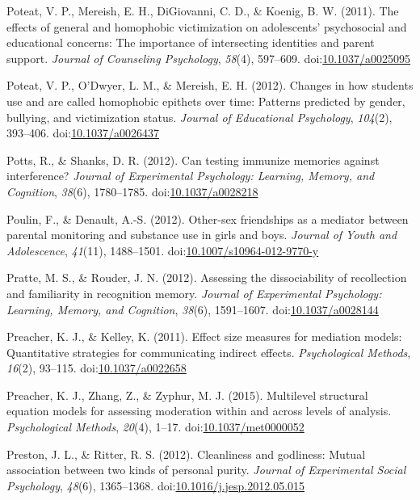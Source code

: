 \documentclass[english,man]{apa6}
\begin{document}
\hypertarget{ref-Poteat2011}{}
Poteat, V. P., Mereish, E. H., DiGiovanni, C. D., \& Koenig, B. W.
(2011). The effects of general and homophobic victimization on
adolescents' psychosocial and educational concerns: The importance of
intersecting identities and parent support. \emph{Journal of Counseling
Psychology}, \emph{58}(4), 597--609.
doi:\href{https://doi.org/10.1037/a0025095}{10.1037/a0025095}

\hypertarget{ref-Poteat2012}{}
Poteat, V. P., O'Dwyer, L. M., \& Mereish, E. H. (2012). Changes in how
students use and are called homophobic epithets over time: Patterns
predicted by gender, bullying, and victimization status. \emph{Journal
of Educational Psychology}, \emph{104}(2), 393--406.
doi:\href{https://doi.org/10.1037/a0026437}{10.1037/a0026437}

\hypertarget{ref-Potts2012}{}
Potts, R., \& Shanks, D. R. (2012). Can testing immunize memories
against interference? \emph{Journal of Experimental Psychology:
Learning, Memory, and Cognition}, \emph{38}(6), 1780--1785.
doi:\href{https://doi.org/10.1037/a0028218}{10.1037/a0028218}

\hypertarget{ref-Poulin2012}{}
Poulin, F., \& Denault, A.-S. (2012). Other-sex friendships as a
mediator between parental monitoring and substance use in girls and
boys. \emph{Journal of Youth and Adolescence}, \emph{41}(11),
1488--1501.
doi:\href{https://doi.org/10.1007/s10964-012-9770-y}{10.1007/s10964-012-9770-y}

\hypertarget{ref-Pratte2012}{}
Pratte, M. S., \& Rouder, J. N. (2012). Assessing the dissociability of
recollection and familiarity in recognition memory. \emph{Journal of
Experimental Psychology: Learning, Memory, and Cognition}, \emph{38}(6),
1591--1607.
doi:\href{https://doi.org/10.1037/a0028144}{10.1037/a0028144}

\hypertarget{ref-Preacher2011}{}
Preacher, K. J., \& Kelley, K. (2011). Effect size measures for
mediation models: Quantitative strategies for communicating indirect
effects. \emph{Psychological Methods}, \emph{16}(2), 93--115.
doi:\href{https://doi.org/10.1037/a0022658}{10.1037/a0022658}

\hypertarget{ref-Preacher2015}{}
Preacher, K. J., Zhang, Z., \& Zyphur, M. J. (2015). Multilevel
structural equation models for assessing moderation within and across
levels of analysis. \emph{Psychological Methods}, \emph{20}(4), 1--17.
doi:\href{https://doi.org/10.1037/met0000052}{10.1037/met0000052}

\hypertarget{ref-Preston2012}{}
Preston, J. L., \& Ritter, R. S. (2012). Cleanliness and godliness:
Mutual association between two kinds of personal purity. \emph{Journal
of Experimental Social Psychology}, \emph{48}(6), 1365--1368.
doi:\href{https://doi.org/10.1016/j.jesp.2012.05.015}{10.1016/j.jesp.2012.05.015}
\end{document}
